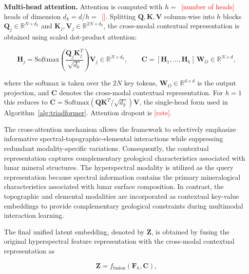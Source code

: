 \documentclass[pdflatex,sn-mathphys-num]{sn-jnl}
\newcommand{\fillin}[1]{\textcolor{red}{[#1]}}
\begin{document}
\textbf{Multi-head attention.} Attention is computed with $h=$~\fillin{number of heads} heads of dimension $d_k=d/h=$~\fillin{}. Splitting $\mathbf{Q},\mathbf{K},\mathbf{V}$ column-wise into $h$ blocks $\mathbf{Q}_j\in\mathbb{R}^{N\times d_k}$ and $\mathbf{K}_j,\mathbf{V}_j\in\mathbb{R}^{2N\times d_k}$, the cross-modal contextual representation is obtained using scaled dot-product attention:

\[
\mathbf{H}_j
=
\mathrm{Softmax}
\left(
\frac{\mathbf{Q}_j\mathbf{K}_j^{T}}
{\sqrt{d_{k}}}
\right)\mathbf{V}_j\in\mathbb{R}^{N\times d_k},
\qquad
\mathbf{C}=[\mathbf{H}_1,\ldots,\mathbf{H}_h]\,\mathbf{W}_{O}\in\mathbb{R}^{N\times d},
\]

where the softmax is taken over the $2N$ key tokens, $\mathbf{W}_O\in\mathbb{R}^{d\times d}$ is the output projection, and $\mathbf{C}$ denotes the cross-modal contextual representation. For $h=1$ this reduces to $\mathbf{C}=\mathrm{Softmax}(\mathbf{Q}\mathbf{K}^{T}/\sqrt{d_k})\mathbf{V}$, the single-head form used in Algorithm~\ref{alg:triadformer}. Attention dropout is \fillin{rate}.

The cross-attention mechanism allows the framework to selectively emphasize informative spectral-topographic-elemental interactions while suppressing redundant modality-specific variations. Consequently, the contextual representation captures complementary geological characteristics associated with lunar mineral structures. The hyperspectral modality is utilized as the query representation because spectral information contains the primary mineralogical characteristics associated with lunar surface composition. In contrast, the topographic and elemental modalities are incorporated as contextual key-value embeddings to provide complementary geological constraints during multimodal interaction learning.

The final unified latent embedding, denoted by $\mathbf{Z}$, is obtained by fusing the original hyperspectral feature representation with the cross-modal contextual representation as

\[
\mathbf{Z}
=
f_{\mathrm{fusion}}
(\mathbf{F}_{h},\mathbf{C}),
\]
\end{document}
